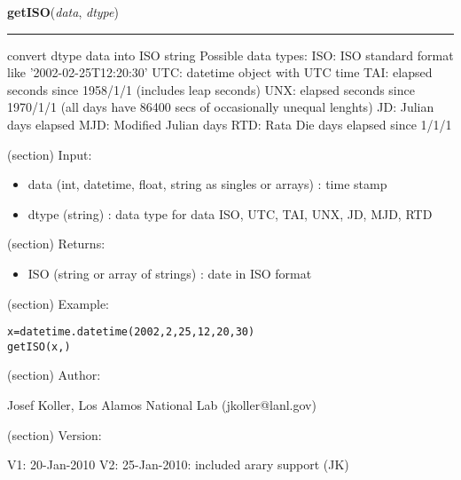     \label{spacepy:ticktock:getISO}

    \vspace{0.5ex}

\hspace{.8\funcindent}\begin{boxedminipage}{\funcwidth}

    \raggedright \textbf{getISO}(\textit{data}, \textit{dtype})

    \vspace{-1.5ex}

    \rule{\textwidth}{0.5\fboxrule}
\setlength{\parskip}{2ex}
    convert dtype data into ISO string Possible data types: ISO: ISO 
    standard format like '2002-02-25T12:20:30' UTC: datetime object with 
    UTC time TAI: elapsed seconds since 1958/1/1 (includes leap seconds) 
    UNX: elapsed seconds since 1970/1/1 (all days have 86400 secs of 
    occasionally unequal lenghts) JD: Julian days elapsed MJD: Modified 
    Julian days RTD: Rata Die days elapsed since 1/1/1

    (section) Input:

      \begin{itemize}
      \setlength{\parskip}{0.6ex}
        \item data (int, datetime, float, string as singles or arrays) : time 
          stamp

        \item dtype (string) : data type for data ISO, UTC, TAI, UNX, JD, MJD, 
          RTD

      \end{itemize}

    (section) Returns:

      \begin{itemize}
      \setlength{\parskip}{0.6ex}
        \item ISO (string or array of strings) : date in ISO format

      \end{itemize}

    (section) Example:

\begin{alltt}
\pysrcprompt{{\textgreater}{\textgreater}{\textgreater} }x=datetime.datetime(2002,2,25,12,20,30)
\pysrcprompt{{\textgreater}{\textgreater}{\textgreater} }getISO(x, )
\end{alltt}
    (section) Author:

      Josef Koller, Los Alamos National Lab (jkoller@lanl.gov)

    (section) Version:

      V1: 20-Jan-2010 V2: 25-Jan-2010: included arary support (JK)

\setlength{\parskip}{1ex}
    \end{boxedminipage}

